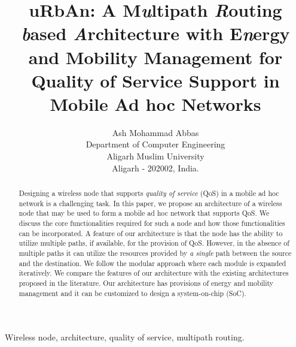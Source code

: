 \documentclass[10pt,times,epsfig,psfig,twocolumn,algorithm,algorithmic]{IEEEtran}
\begin{document}
\title{uRbAn: A M{\em u}ltipath {\em R}outing {\em b}ased {\em A}rchitecture with E{\em n}ergy and Mobility Management for Quality of Service Support in Mobile Ad hoc Networks}
\author{Ash Mohammad Abbas\\Department of Computer Engineering\\
Aligarh Muslim University\\
Aligarh - 202002, India.}


\maketitle
\thispagestyle{empty}\pagestyle{empty}

\begin{abstract}
Designing a wireless node that supports {\em quality of service} (QoS) in a mobile ad hoc network is a challenging task. In this paper, we propose an architecture of a wireless node that may be used to form a mobile ad hoc network that supports QoS. We discuss the core functionalities required for such a node and how those functionalities can be incorporated. A feature of our architecture is that the node has the ability to utilize multiple paths, if available, for the provision of QoS. However, in the absence of multiple paths it can utilize the resources provided by {\em a single} path between the source and the destination. We follow the modular approach where each module is expanded iteratively. We compare the features of our architecture with the existing architectures proposed in the literature.  Our architecture has provisions of energy and mobility management and it can be customized to design a system-on-chip (SoC).   
\end{abstract}
\begin{IEEEkeywords}
Wireless node, architecture, quality of service, multipath routing.
\end{IEEEkeywords}
\end{document}

